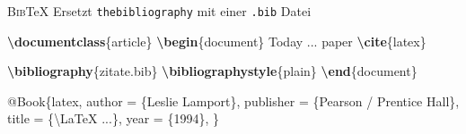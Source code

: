 \documentclass[aspectratio=169]{beamer}
\newenvironment{Shaded}{\begin{snugshade}}{\end{snugshade}}
\newcommand{\BuiltInTok}[1]{\textcolor[rgb]{0.25,0.67,0.19}{\textbf{#1}}}
\newcommand{\CharTok}[1]{\textcolor[rgb]{0.45,0.38,0.60}{#1}}
\newcommand{\DataTypeTok}[1]{\textcolor[rgb]{0.24,0.65,0.58}{#1}}
\newcommand{\ExtensionTok}[1]{\textcolor[rgb]{0.25,0.67,0.19}{#1}}
\newcommand{\KeywordTok}[1]{\textcolor[rgb]{0.25,0.67,0.19}{\textbf{#1}}}
\newcommand{\NormalTok}[1]{\textcolor[rgb]{0.19,0.19,0.19}{#1}}
\newcommand{\OtherTok}[1]{\textcolor[rgb]{0.19,0.19,0.19}{#1}}
\newcommand{\VariableTok}[1]{\textcolor[rgb]{0.44,0.55,0.28}{#1}}
\newenvironment{Shaded}{}{}
\newcommand\citestyle[1]{\textcolor{foreground-secondary}{\textsuperscript{#1}}}
\let\oldautocite\autocite
\renewcommand{\autocite}[1]{\citestyle{\oldautocite{#1}}}
\begin{document}
    \begin{frame}[fragile]{\textsc{Bib}\TeX}
    \protect\hypertarget{section-1}{}
    Ersetzt \texttt{thebibliography} mit einer \texttt{.bib} Datei
    \autocite{overleaf-bibtex}\\

    \begin{minipage}{0.495\textwidth}

\begin{Shaded}
\begin{Highlighting}[]
\BuiltInTok{\textbackslash{}documentclass}\NormalTok{\{}\ExtensionTok{article}\NormalTok{\}}
\KeywordTok{\textbackslash{}begin}\NormalTok{\{}\ExtensionTok{document}\NormalTok{\}}
\NormalTok{\textasciigrave{}\textasciigrave{}Today ... paper\textquotesingle{}\textquotesingle{} }
\KeywordTok{\textbackslash{}cite}\NormalTok{\{}\ExtensionTok{latex}\NormalTok{\}}

\BuiltInTok{\textbackslash{}bibliography}\NormalTok{\{}\ExtensionTok{zitate.bib}\NormalTok{\}}
\BuiltInTok{\textbackslash{}bibliographystyle}\NormalTok{\{}\ExtensionTok{plain}\NormalTok{\}}
\KeywordTok{\textbackslash{}end}\NormalTok{\{}\ExtensionTok{document}\NormalTok{\}}
\end{Highlighting}
\end{Shaded}

    \end{minipage}\begin{minipage}{0.01\textwidth}

    \phantom{x}

    \end{minipage}\begin{minipage}{0.495\textwidth}

\begin{Shaded}
\begin{Highlighting}[]
\VariableTok{@Book}\NormalTok{\{}\OtherTok{latex}\NormalTok{,}
  \DataTypeTok{author}\NormalTok{ = \{Leslie Lamport\},}
  \DataTypeTok{publisher}\NormalTok{ = \{Pearson }
\NormalTok{      / Prentice Hall\},}
  \DataTypeTok{title}\NormalTok{ = \{}\CharTok{\textbackslash{}LaTeX}\NormalTok{ ...\},}
  \DataTypeTok{year}\NormalTok{ = \{1994\},}
\NormalTok{\}}
\end{Highlighting}
\end{Shaded}

    \centering{\textcolor{foreground-secondary}{\scriptsize zitate.bib}}

    \end{minipage}


\end{frame}
\end{document}
